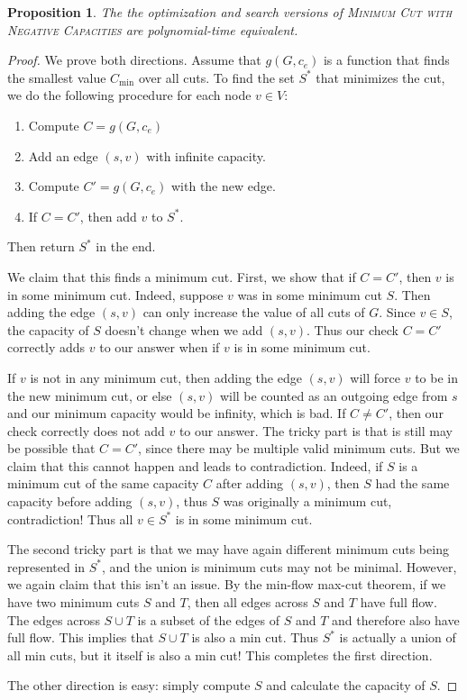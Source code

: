\documentclass[10pt]{article}
\newtheorem{proposition}[lemma]{Proposition}
\begin{document}
\begin{proposition}
  The the optimization and search versions of \textsc{Minimum Cut with Negative Capacities} are polynomial-time equivalent.
\end{proposition}

\begin{proof}
  We prove both directions. Assume that \(g(G, c_e)\) is a function that finds the smallest value \(C_{\text{min}}\) over all cuts. To find the set \(S^*\) that minimizes the cut, we do the following procedure for each node \(v \in V\):
  \begin{enumerate}
    \item Compute \(C = g(G, c_e)\)
    \item Add an edge \((s, v)\) with infinite capacity.
    \item Compute \(C' = g(G, c_e)\) with the new edge.
    \item If \(C = C'\), then add \(v\) to \(S^*\).
  \end{enumerate}
  Then return \(S^*\) in the end.

  We claim that this finds a minimum cut. First, we show that if \(C = C'\), then \(v\) is in some minimum cut. Indeed, suppose \(v\) was in some minimum cut \(S\). Then adding the edge \((s, v)\) can only increase the value of all cuts of \(G\). Since \(v \in S\), the capacity of \(S\) doesn't change when we add \((s, v)\). Thus our check \(C = C'\) correctly adds \(v\) to our answer when if \(v\) is in some minimum cut. 

  If \(v\) is not in any minimum cut, then adding the edge \((s, v)\) will force \(v\) to be in the new minimum cut, or else \((s, v)\) will be counted as an outgoing edge from \(s\) and our minimum capacity would be infinity, which is bad. If \(C \neq C'\), then our check correctly does not add \(v\) to our answer. The tricky part is that is still may be possible that \(C = C'\), since there may be multiple valid minimum cuts. But we claim that this cannot happen and leads to contradiction. Indeed, if \(S\) is a minimum cut of the same capacity \(C\) after adding \((s, v)\), then \(S\) had the same capacity before adding \((s, v)\), thus \(S\) was originally a minimum cut, contradiction! Thus all \(v \in S^*\) is in some minimum cut. 

  The second tricky part is that we may have again different minimum cuts being represented in \(S^*\), and the union is minimum cuts may not be minimal. However, we again claim that this isn't an issue. By the min-flow max-cut theorem, if we have two minimum cuts \(S\) and \(T\), then all edges across \(S\) and \(T\) have full flow. The edges across \(S \cup T\) is a subset of the edges of \(S\) and \(T\) and therefore also have full flow. This implies that \(S \cup T\) is also a min cut. Thus \(S^*\) is actually a union of all min cuts, but it itself is also a min cut! This completes the first direction. 
  
  The other direction is easy: simply compute \(S\) and calculate the capacity of \(S\).
\end{proof}
\end{document}
